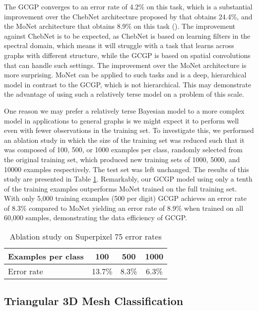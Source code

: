 \documentclass{article}
\begin{document}
The GCGP converges to an error rate of 4.2\% on this task, which is a substantial improvement over the ChebNet architecture proposed by \citet{chebnet} that obtains 24.4\%, and the MoNet architecture that obtains 8.9\% on this task (\citet{moNet}). The improvement against ChebNet is to be expected, as ChebNet is based on learning filters in the spectral domain, which means it will struggle with a task that learns across graphs with different structure, while the GCGP is based on spatial convolutions that can handle such settings. The improvement over the MoNet architecture is more surprising. MoNet can be applied to such tasks and is a deep, hierarchical model in contrast to the GCGP, which is not hierarchical. This may demonstrate the advantage of using such a relatively terse model on a problem of this scale. 

One reason we may prefer a relatively terse Bayesian model to a more complex model in applications to general graphs is we might expect it to perform well even with fewer observations in the training set. To investigate this, we performed an ablation study in which the size of the training set was reduced such that it was composed of 100, 500, or 1000 examples per class, randomly selected from the original training set, which produced new training sets of 1000, 5000, and 10000 examples respectively. The test set was left unchanged.  
The results of this study are presented in Table \ref{tab:ablation}. Remarkably, our GCGP model using only a tenth of the training examples outperforms MoNet trained on the full training set. With only 5,000 training examples (500 per digit) GCGP achieves an error rate of 8.3\% compared to MoNet yielding an error rate of 8.9\% when trained on all 60,000 samples, demonstrating the data efficiency of GCGP. 
\begin{table}[tb]
	\centering
	\caption{Ablation study on Superpixel 75 error rates}
	\label{tab:ablation}
	\begin{tabular}{lccc}
		\toprule
		Examples per class & 100 &  500 & 1000\\
		\midrule
		Error rate & 13.7\% & 8.3\% & 6.3\% \\ 
	\end{tabular}
	\vspace{-.6cm}
\end{table}

\subsection{Triangular 3D Mesh Classification}\label{sec:meshes}
\end{document}
